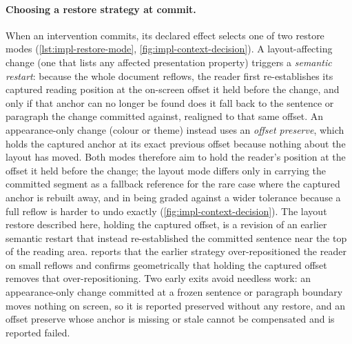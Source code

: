 \paragraph{Choosing a restore strategy at commit.}
When an intervention commits, its declared effect selects one of two restore modes (\cref{lst:impl-restore-mode}, \cref{fig:impl-context-decision}).
A layout-affecting change (one that lists any affected presentation property) triggers a \emph{semantic restart}: because the whole document reflows, the reader first re-establishes its captured reading position at the on-screen offset it held before the change, and only if that anchor can no longer be found does it fall back to the sentence or paragraph the change committed against, realigned to that same offset.
An appearance-only change (colour or theme) instead uses an \emph{offset preserve}, which holds the captured anchor at its exact previous offset because nothing about the layout has moved.
Both modes therefore aim to hold the reader's position at the offset it held before the change; the layout mode differs only in carrying the committed segment as a fallback reference for the rare case where the captured anchor is rebuilt away, and in being graded against a wider tolerance because a full reflow is harder to undo exactly (\cref{fig:impl-context-decision}).
The layout restore described here, holding the captured offset, is a revision of an earlier semantic restart that instead re-established the committed sentence near the top of the reading area.
 reports that the earlier strategy over-repositioned the reader on small reflows and confirms geometrically that holding the captured offset removes that over-repositioning.
Two early exits avoid needless work: an appearance-only change committed at a frozen sentence or paragraph boundary moves nothing on screen, so it is reported preserved without any restore, and an offset preserve whose anchor is missing or stale cannot be compensated and is reported failed.

